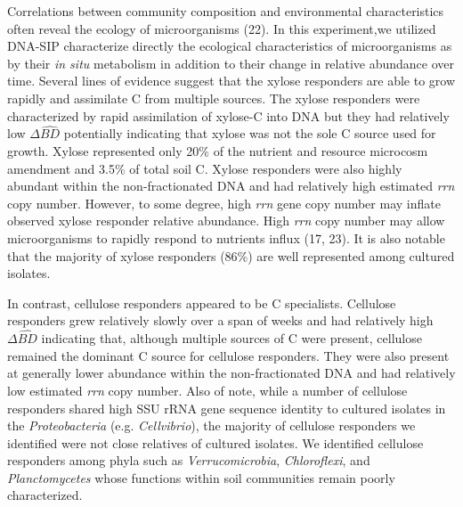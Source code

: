 Correlations between community composition and environmental characteristics
often reveal the ecology of microorganisms (22). In this experiment,we utilized
DNA-SIP characterize directly the ecological characteristics of microorganisms
as by their \textit{in situ} metabolism in addition to their change in relative
abundance over time. Several lines of evidence suggest that the xylose
responders are able to grow rapidly and assimilate C from
multiple sources. The xylose responders were characterized by rapid
assimilation of xylose-C into DNA but they had relatively low $\Delta\hat{BD}$
potentially indicating that xylose was not the sole C source used for growth.
Xylose represented only 20\% of the nutrient and resource microcosm amendment
and 3.5\% of total soil C. Xylose responders were also highly
abundant within the non-fractionated DNA and had relatively high estimated
\textit{rrn} copy number. However, to some degree, high \textit{rrn} gene copy
number may inflate observed xylose responder relative abundance. High
\textit{rrn} copy number may allow microorganisms to rapidly respond to
nutrients influx (17, 23). It is also notable that the majority of
xylose responders (86\%) are well represented among cultured isolates. 

In contrast, cellulose responders appeared to be C specialists.
Cellulose responders grew relatively slowly over a span of weeks and had
relatively high $\Delta\hat{BD}$ indicating that, although multiple sources of
C were present, cellulose remained the dominant C source for cellulose
responders. They were also present at generally lower abundance within the
non-fractionated DNA and had relatively low estimated \textit{rrn} copy number.
Also of note, while a number of cellulose responders shared high SSU rRNA gene
sequence identity to cultured isolates in the \textit{Proteobacteria} (e.g.
\textit{Cellvibrio}), the majority of cellulose responders we identified were
not close relatives of cultured isolates. We identified cellulose responders
among phyla such as \textit{Verrucomicrobia}, \textit{Chloroflexi}, and
\textit{Planctomycetes} whose functions within soil communities remain poorly
characterized.

